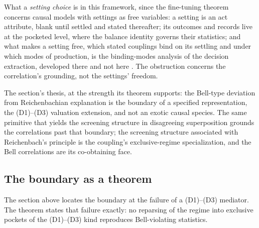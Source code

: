 \documentclass[11pt]{article}
\begin{document}
What a \emph{setting choice} is in this framework, since the fine-tuning theorem concerns causal models with settings as free variables: a setting is an act attribute, blank until settled and stated thereafter; its outcomes and records live at the pocketed level, where the balance identity governs their statistics; and what makes a setting free, which stated couplings bind on its settling and under which modes of production, is the binding-modes analysis of the decision extraction, developed there and not here \cite{AethusDecision}. The obstruction concerns the correlation's grounding, not the settings' freedom.

The section's thesis, at the strength its theorem supports: the Bell-type deviation from Reichenbachian explanation is the boundary of a specified representation, the (D1)--(D3) valuation extension, and not an exotic causal species. The same primitive that yields the screening structure in disagreeing superposition grounds the correlations past that boundary; the screening structure associated with Reichenbach's principle is the coupling's exclusive-regime specialization, and the Bell correlations are its co-obtaining face.

\subsection{The boundary as a theorem}\label{sec:boundary_theorem}

The section above locates the boundary at the failure of a (D1)--(D3) mediator. The theorem states that failure exactly: no reparsing of the regime into exclusive pockets of the (D1)--(D3) kind reproduces Bell-violating statistics.
\end{document}
